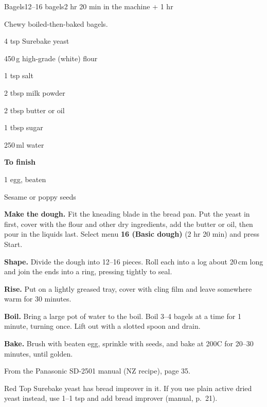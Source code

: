 \begin{recipebox}{Bagels}{12--16 bagels}{2 hr 20 min in the machine + 1 hr}

Chewy boiled-then-baked bagels.

\begin{ingredients}
  \item 4 tsp Surebake yeast
  \item 450\,g high-grade (white) flour
  \item 1 tsp salt
  \item 2 tbsp milk powder
  \item 2 tbsp butter or oil
  \item 1 tbsp sugar
  \item 250\,ml water
  \item[] \textbf{To finish}
  \item 1 egg, beaten
  \item Sesame or poppy seeds
\end{ingredients}

\begin{method}
  \item \textbf{Make the dough.} Fit the kneading blade in the bread pan. Put the yeast in first, cover with the flour and other dry ingredients, add the butter or oil, then pour in the liquids last. Select menu \textbf{16 (Basic dough)} (2 hr 20 min) and press Start.
  \item \textbf{Shape.} Divide the dough into 12--16 pieces. Roll each into a log about 20\,cm long and join the ends into a ring, pressing tightly to seal.
  \item \textbf{Rise.} Put on a lightly greased tray, cover with cling film and leave somewhere warm for 30 minutes.
  \item \textbf{Boil.} Bring a large pot of water to the boil. Boil 3--4 bagels at a time for 1 minute, turning once. Lift out with a slotted spoon and drain.
  \item \textbf{Bake.} Brush with beaten egg, sprinkle with seeds, and bake at 200\degree C for 20--30 minutes, until golden.
\end{method}

\begin{notelist}
  \item From the Panasonic SD-2501 manual (NZ recipe), page 35.
  \item Red Top Surebake yeast has bread improver in it. If you use plain active dried yeast instead, use 1--1 tsp and add bread improver (manual, p.~21).
\end{notelist}

\end{recipebox}
